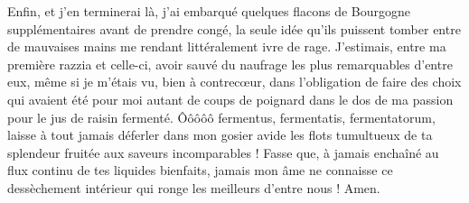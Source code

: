Enfin, et j’en terminerai là, j’ai embarqué quelques flacons de Bourgogne supplémentaires avant de prendre congé, la seule idée qu’ils puissent tomber entre de mauvaises mains me rendant littéralement ivre de rage. J’estimais, entre ma première razzia et celle-ci, avoir sauvé du naufrage les plus remarquables d’entre eux, même si je m’étais vu, bien à contrecœur, dans l’obligation de faire des choix qui avaient été pour moi autant de coups de poignard dans le dos de ma passion pour le jus de raisin fermenté. Ôôôôô fermentus, fermentatis, fermentatorum, laisse à tout jamais déferler dans mon gosier avide les flots tumultueux de ta splendeur fruitée aux saveurs incomparables ! Fasse que, à jamais enchaîné au flux continu de tes liquides bienfaits, jamais mon âme ne connaisse ce dessèchement intérieur qui ronge les meilleurs d’entre nous ! Amen.

%
